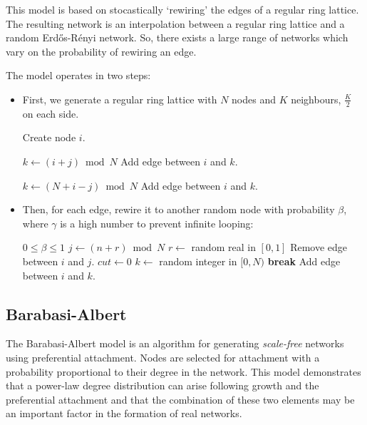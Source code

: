 \documentclass[a4paper,11pt,titlepage]{article}
\begin{document}
This model is based on stocastically `rewiring' the edges of a regular ring 
lattice. The resulting network is an interpolation between a regular ring lattice
and a random Erd\H{o}s-R\'{e}nyi network. So, there exists a large range of
networks which vary on the probability of rewiring an edge.


The model operates in two steps:

\begin{itemize}

\item
  First, we generate a regular ring lattice with $N$ nodes and $K$ neighbours,
  $\frac{K}{2}$ on each side.

  \begin{algorithmic}
      \STATE Create node $i$.
    \ENDFOR

        \STATE $k \gets (i + j) \bmod{N}$
        \STATE Add edge between $i$ and $k$.
      \ENDFOR

        \STATE $k \gets (N + i - j) \bmod{N}$
        \STATE Add edge between $i$ and $k$.
      \ENDFOR
    \ENDFOR
  \end{algorithmic}

\item
  Then, for each edge, rewire it to another random node with probability
  $\beta$, where $\gamma$ is a high number to prevent infinite looping:

  \begin{algorithmic}
    \REQUIRE $0 \leq \beta \leq 1$
        \STATE $j \gets (n + r) \bmod{N}$
        \STATE $r \gets$ random real in $[0, 1]$
          \STATE Remove edge between $i$ and $j$.
          \STATE $cut \gets 0$
            \STATE $k \gets$ random integer in $[0, N)$
              \STATE \textbf{break}
            \ELSE
              \STATE Add edge between $i$ and $k$.
            \ENDIF
          \ENDFOR
        \ENDIF
      \ENDFOR
    \ENDFOR
  \end{algorithmic}
\end{itemize}

\subsection{Barabasi-Albert}
The Barabasi-Albert model is an algorithm for generating \emph{scale-free} networks
using preferential attachment. Nodes are selected for attachment with a
probability proportional to their degree in the network. This model demonstrates
that a power-law degree distribution can arise following growth and the 
preferential attachment and that the combination of these two elements may be an 
important factor in the formation of real networks. \cite{oconn11}
\end{document}

